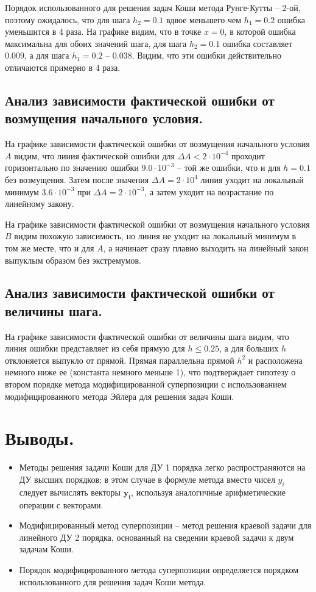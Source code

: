 \documentclass[a4paper, 12pt]{article}
\begin{document}
	Порядок использованного для решения задач Коши метода Рунге-Кутты -- 2-ой, поэтому ожидалось, что для шага $h_2=0.1$ вдвое меньшего чем $h_1=0.2$ ошибка уменьшится в 4 раза. На графике видим, что в точке $x=0$, в которой ошибка максимальна для обоих значений шага, для шага $h_2=0.1$ ошибка составляет $0.009$, а для шага $h_1 = 0.2$ -- $0.038$. Видим, что эти ошибки действительно отличаются примерно в 4 раза.
	
	\subsection{Анализ зависимости фактической ошибки от возмущения начального условия.}
	
	На графике зависимости фактической ошибки от возмущения начального условия $A$ видим, что линия фактической ошибки для $\Delta A < 2\cdot10^{-4}$ проходит горизонтально по значению ошибки $9.0\cdot10^{-3}$ -- той же ошибки, что и для $h=0.1$ без возмущения. Затем после значения $\Delta A = 2\cdot10^4$ линия уходит на локальный минимум $3.6\cdot10^{-3}$ при $\Delta A = 2\cdot10^{-3}$, а затем уходит на возрастание по линейному закону.
	
	На графике зависимости фактической ошибки от возмущения начального условия $B$ видим похожую зависимость, но линия не уходит на локальный минимум в том же месте, что и для $A$, а начинает сразу плавно выходить на линейный закон выпуклым образом без экстремумов.
	
	\subsection{Анализ зависимости фактической ошибки от величины шага.}
	
	На графике зависимости фактической ошибки от величины шага видим, что линия ошибки представляет из себя прямую для $h\leq0.25$, а для больших $h$ отклоняется выпукло от прямой. Прямая параллельна прямой $h^2$ и расположена немного ниже ее (константа немного меньше 1), что подтверждает гипотезу о втором порядке метода модифицированной суперпозиции с использованием модифицированного метода Эйлера для решения задач Коши.
	
	\section{Выводы.}
	
	\begin{itemize}
		\item Методы решения задачи Коши для ДУ 1 порядка легко распространяются на ДУ высших порядков; в этом случае в формуле метода вместо чисел $y_i$ следует вычислять векторы $\mathbf{y_i}$, используя аналогичные арифметические операции с векторами.
		\item Модифицированный метод суперпозиции -- метод решения краевой задачи для линейного ДУ 2 порядка, основанный на сведении краевой задачи к двум задачам Коши.
		\item Порядок модифицированного метода суперпозиции определяется порядком использованного для решения задач Коши метода.
	\end{itemize}
	
\end{document}
